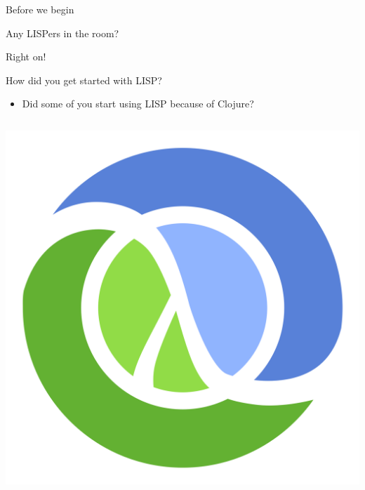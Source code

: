 \documentclass[bigger]{beamer}
\begin{document}
\begin{frame}[label=sec-1-3]{Before we begin}
\begin{block}{Any LISPers in the room?}
\end{block}
\end{frame}
\begin{frame}[label=sec-1-4]{Right on!}
\end{frame}

\begin{frame}[label=sec-1-5]{How did you get started with LISP?}
\begin{itemize}
\item Did some of you start using LISP because of Clojure?
\end{itemize}

\begin{columns}
\begin{column}{0.45\textwidth}
\begin{block}{}
\center\includegraphics[height=0.25\textheight]{images/clojure_logo.png}
\end{block}
\end{column}


\end{columns}
\end{frame}
\end{document}

